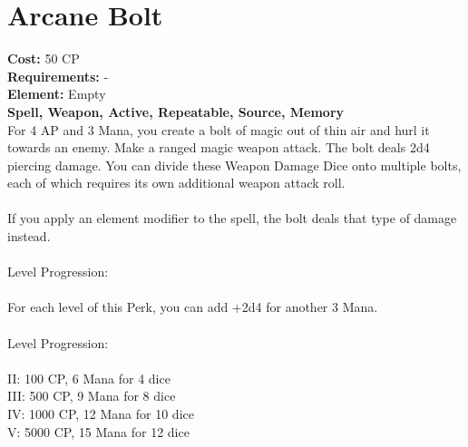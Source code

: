 \section{Arcane Bolt}
\textbf{Cost:} 50 CP\\
\textbf{Requirements:} -\\
\textbf{Element:} Empty\\
\textbf{Spell, Weapon, Active, Repeatable, Source, Memory}\\
For 4 AP and 3 Mana, you create a bolt of magic out of thin air and hurl it towards an enemy. Make a ranged magic weapon attack. The bolt deals 2d4 piercing damage. You can divide these Weapon Damage Dice onto multiple bolts, each of which requires its own additional weapon attack roll.\\
\\
If you apply an element modifier to the spell, the bolt deals that type of damage instead.\\
\\
Level Progression:\\
\\
For each level of this Perk, you can add +2d4 for another 3 Mana. \\
\\
Level Progression:\\
\\
II: 100 CP, 6 Mana for 4 dice\\
III: 500 CP, 9 Mana for 8 dice\\
IV: 1000 CP, 12 Mana for 10 dice\\
V: 5000 CP, 15 Mana for 12 dice\\